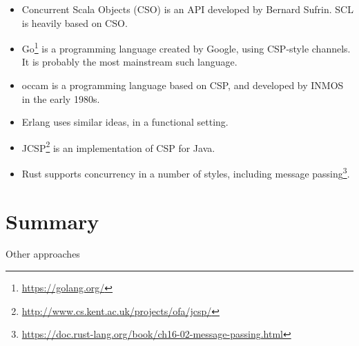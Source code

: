 



\begin{itemize}
\item Concurrent Scala Objects (CSO) is an API developed by Bernard Sufrin.
  SCL is heavily based on CSO.

\item Go\footnote{\url{https://golang.org/}} is a programming language created
by Google, using CSP-style channels.  It is probably the most
mainstream such language.

\item
{\sf occam} is a programming language based on CSP, and developed by INMOS in
the early 1980s.

\item Erlang uses similar ideas, in a functional setting.

\item JCSP\footnote{\url{http://www.cs.kent.ac.uk/projects/ofa/jcsp/}} is an
implementation of CSP for Java.



\item Rust supports concurrency in a number of styles, including message
  passing\footnote{%
    \url{https://doc.rust-lang.org/book/ch16-02-message-passing.html}}. 

\end{itemize}




\section{Summary}

Other approaches

